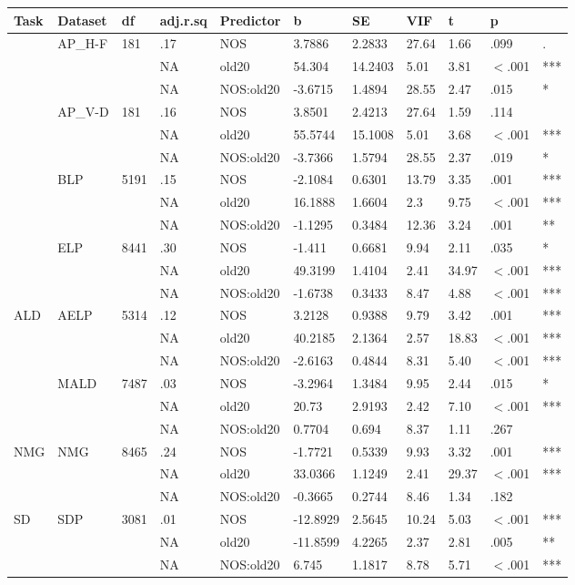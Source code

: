 \begin{table}[ht]
\centering
\begingroup\normalsize
\begin{tabular}{lllllllllll}
  \hline
Task & Dataset & df & adj.r.sq & Predictor & b & SE & VIF & t & p &  \\ 
  \hline
 & AP\_H-F & 181 & .17 & NOS & 3.7886 & 2.2833 & 27.64 & 1.66 & .099 & . \\ 
   &  &  & NA & old20 & 54.304 & 14.2403 & 5.01 & 3.81 & $<$.001 & *** \\ 
   &  &  & NA & NOS:old20 & -3.6715 & 1.4894 & 28.55 & 2.47 & .015 & * \\ 
   & AP\_V-D & 181 & .16 & NOS & 3.8501 & 2.4213 & 27.64 & 1.59 & .114 &   \\ 
   &  &  & NA & old20 & 55.5744 & 15.1008 & 5.01 & 3.68 & $<$.001 & *** \\ 
   &  &  & NA & NOS:old20 & -3.7366 & 1.5794 & 28.55 & 2.37 & .019 & * \\ 
   & BLP & 5191 & .15 & NOS & -2.1084 & 0.6301 & 13.79 & 3.35 & .001 & *** \\ 
   &  &  & NA & old20 & 16.1888 & 1.6604 & 2.3 & 9.75 & $<$.001 & *** \\ 
   &  &  & NA & NOS:old20 & -1.1295 & 0.3484 & 12.36 & 3.24 & .001 & ** \\ 
   & ELP & 8441 & .30 & NOS & -1.411 & 0.6681 & 9.94 & 2.11 & .035 & * \\ 
   &  &  & NA & old20 & 49.3199 & 1.4104 & 2.41 & 34.97 & $<$.001 & *** \\ 
   &  &  & NA & NOS:old20 & -1.6738 & 0.3433 & 8.47 & 4.88 & $<$.001 & *** \\ 
  ALD & AELP & 5314 & .12 & NOS & 3.2128 & 0.9388 & 9.79 & 3.42 & .001 & *** \\ 
   &  &  & NA & old20 & 40.2185 & 2.1364 & 2.57 & 18.83 & $<$.001 & *** \\ 
   &  &  & NA & NOS:old20 & -2.6163 & 0.4844 & 8.31 & 5.40 & $<$.001 & *** \\ 
   & MALD & 7487 & .03 & NOS & -3.2964 & 1.3484 & 9.95 & 2.44 & .015 & * \\ 
   &  &  & NA & old20 & 20.73 & 2.9193 & 2.42 & 7.10 & $<$.001 & *** \\ 
   &  &  & NA & NOS:old20 & 0.7704 & 0.694 & 8.37 & 1.11 & .267 &   \\ 
  NMG & NMG & 8465 & .24 & NOS & -1.7721 & 0.5339 & 9.93 & 3.32 & .001 & *** \\ 
   &  &  & NA & old20 & 33.0366 & 1.1249 & 2.41 & 29.37 & $<$.001 & *** \\ 
   &  &  & NA & NOS:old20 & -0.3665 & 0.2744 & 8.46 & 1.34 & .182 &   \\ 
  SD & SDP & 3081 & .01 & NOS & -12.8929 & 2.5645 & 10.24 & 5.03 & $<$.001 & *** \\ 
   &  &  & NA & old20 & -11.8599 & 4.2265 & 2.37 & 2.81 & .005 & ** \\ 
   &  &  & NA & NOS:old20 & 6.745 & 1.1817 & 8.78 & 5.71 & $<$.001 & *** \\ 
   \hline
\end{tabular}
\endgroup
\end{table}
